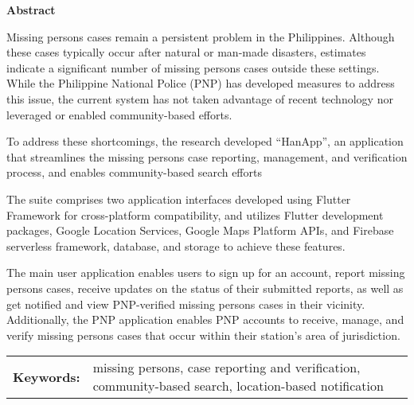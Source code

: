 \doublespacing
\begin{center}
\textbf{Abstract}
\end{center}

Missing persons cases remain a persistent problem in the Philippines. Although these cases typically occur after natural or man-made disasters, estimates indicate a significant number of missing persons cases outside these settings. While the Philippine National Police (PNP) has developed measures to address this issue, the current system has not taken advantage of recent technology nor leveraged or enabled community-based efforts.

To address these shortcomings, the research developed “HanApp”, an application that streamlines the missing persons case reporting, management, and verification process, and enables community-based search efforts

The suite comprises two application interfaces developed using Flutter Framework for cross-platform compatibility, and utilizes Flutter development packages, Google Location Services, Google Maps Platform APIs, and Firebase serverless framework, database, and storage to achieve these features. 

The main user application enables users to sign up for an account, report missing persons cases, receive updates on the status of their submitted reports, as well as get notified and view PNP-verified missing persons cases in their vicinity. Additionally, the PNP application enables PNP accounts to receive, manage, and verify missing persons cases that occur within their station’s area of jurisdiction.


\begin{flushleft}
\begin{tabular}{lp{4.25in}}
\hspace{-0.5em}\textbf{Keywords:}\hspace{0.25em} & missing persons, case reporting and verification, community-based search, location-based notification\\
\end{tabular}
\end{flushleft}

